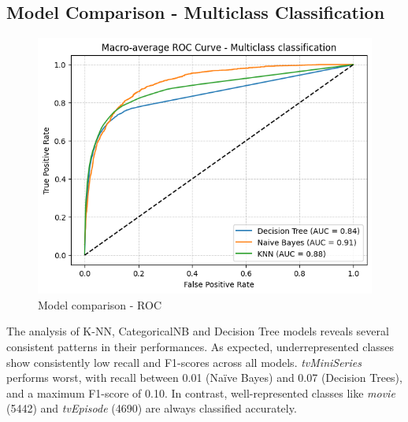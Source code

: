 \subsection{Model Comparison - Multiclass Classification}
\begin{figure}
    \centering
    \captionsetup{justification=raggedleft, width=1\linewidth}
    \caption{Model comparison - ROC}
    \label{fig:multiclass_roc}
    \includegraphics[width=0.9\linewidth]{plots/ROC_multiclass.png}
\end{figure}
The analysis of K-NN, CategoricalNB and Decision Tree models reveals several consistent patterns in their performances. 
As expected, underrepresented classes show consistently low recall and F1-scores across all models.
\textit{tvMiniSeries} performs worst, with recall between 0.01 (Naïve Bayes) and 0.07 (Decision Trees), and a maximum F1-score of 0.10. 
In contrast, well-represented classes like \textit{movie} (5442) and \textit{tvEpisode} (4690) are always classified accurately.\\ 
